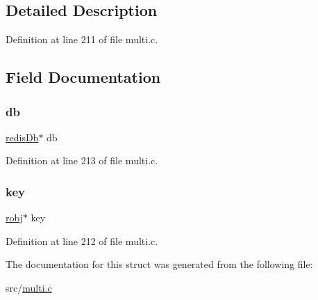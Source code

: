 \subsection{Detailed Description}


Definition at line 211 of file multi.\+c.



\subsection{Field Documentation}
\mbox{\label{structwatched_key_a9bee04e09635a42fef289e42a89f5502}} 
\subsubsection{\texorpdfstring{db}{db}}
{\footnotesize\ttfamily \hyperlink{structredis_db}{redis\+Db}$\ast$ db}



Definition at line 213 of file multi.\+c.

\mbox{\label{structwatched_key_adc0ee0ed345db513fb6fac27511be4f1}} 
\subsubsection{\texorpdfstring{key}{key}}
{\footnotesize\ttfamily \hyperlink{server_8h_a540f174d2685422fbd7d12e3cd44c8e2}{robj}$\ast$ key}



Definition at line 212 of file multi.\+c.



The documentation for this struct was generated from the following file\+:\begin{DoxyCompactItemize}
\item 
src/\hyperlink{multi_8c}{multi.\+c}\end{DoxyCompactItemize}
